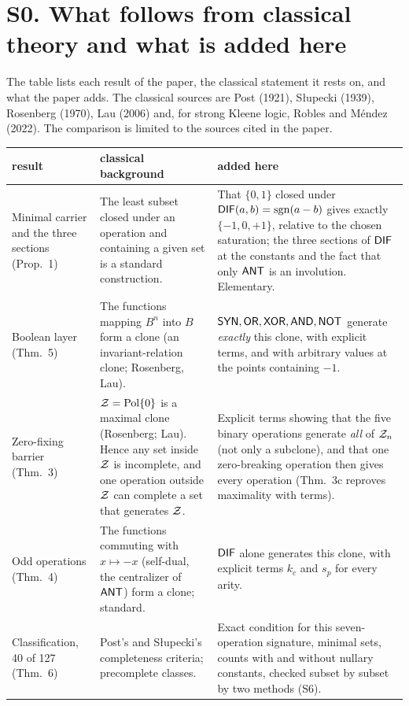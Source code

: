 \documentclass[10pt,a4paper]{article}
\begin{document}
\section*{S0. What follows from classical theory and what is added here}
The table lists each result of the paper, the classical statement it rests on, and what the paper adds. The classical sources are Post (1921), S\l upecki (1939), Rosenberg (1970), Lau (2006) and, for strong Kleene logic, Robles and M\'endez (2022). The comparison is limited to the sources cited in the paper.
\begin{center}\small\begin{longtable}{>{\raggedright\arraybackslash}p{3.6cm}>{\raggedright\arraybackslash}p{5.6cm}>{\raggedright\arraybackslash}p{6.6cm}}
\toprule result&classical background&added here\\\midrule\endhead
Minimal carrier and the three sections (Prop.~1)&The least subset closed under an operation and containing a given set is a standard construction.&That $\{0,1\}$ closed under $\mathsf{DIF}(a,b)=\mathrm{sgn}(a-b)$ gives exactly $\{-1,0,+1\}$, relative to the chosen saturation; the three sections of $\mathsf{DIF}$ at the constants and the fact that only $\mathsf{ANT}$ is an involution. Elementary.\\
Boolean layer (Thm.~5)&The functions mapping $B^n$ into $B$ form a clone (an invariant-relation clone; Rosenberg, Lau).&$\mathsf{SYN},\mathsf{OR},\mathsf{XOR},\mathsf{AND},\mathsf{NOT}$ generate \emph{exactly} this clone, with explicit terms, and with arbitrary values at the points containing $-1$.\\
Zero-fixing barrier (Thm.~3)&$\mathcal Z=\mathrm{Pol}\{0\}$ is a maximal clone (Rosenberg; Lau). Hence any set inside $\mathcal Z$ is incomplete, and one operation outside $\mathcal Z$ can complete a set that generates $\mathcal Z$.&Explicit terms showing that the five binary operations generate \emph{all} of $\mathcal Z_n$ (not only a subclone), and that one zero-breaking operation then gives every operation (Thm.~3c reproves maximality with terms).\\
Odd operations (Thm.~4)&The functions commuting with $x\mapsto-x$ (self-dual, the centralizer of $\mathsf{ANT}$) form a clone; standard.&$\mathsf{DIF}$ alone generates this clone, with explicit terms $k_c$ and $s_p$ for every arity.\\
Classification, 40 of 127 (Thm.~6)&Post's and S\l upecki's completeness criteria; precomplete classes.&Exact condition for this seven-operation signature, minimal sets, counts with and without nullary constants, checked subset by subset by two methods (S6).\\

\end{longtable}
\end{center}
\end{document}
